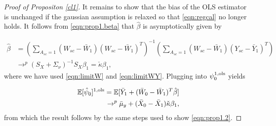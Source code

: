 \begin{proof}[Proof of Propositon \ref{cl1}]
It remains to show that the bias of the OLS estimator is unchanged if the gaussian assumption is relaxed so that \eqref{eqn:regcal} no longer holds. It follows from \eqref{eqn:prop1.beta} that $\hat{\beta}$ is asymptotically given by

    \begin{align*}
    \hat{\beta} &= \left(\sum_{A_{sc}=1} (W_{sc} - \bar{W}_1)(W_{sc} - \bar{W}_1)^T \right)^{-1} \left(\sum_{A_{sc}=1} (W_{sc} - \bar{W}_1)(Y_{sc} - \bar{Y}_1)^T\right) \\
     & \rightarrow^p  (S_X + \Sigma_\nu)^{-1}S_X \beta_1 = \check{\kappa} \beta_1, 
    \end{align*}
where we have used \eqref{eqn:limitW} and \eqref{eqn:limitWY}. Plugging into $\psi_0^{1,\textup{ols}}$ yields

\begin{align*}    
    \mathbb{E}[\hat{\psi}_0]^{1,\textup{ols}} = \mathbb{E}[ \bar{Y}_1 + (\bar{W}_0 - \bar{W}_1)^T \hat{\beta}] \\
    \rightarrow^p  \bar{\mu}_y + (\bar{X}_0 - \bar{X}_1)\check{\kappa} \beta_1,
\end{align*}
from which the result follows by the same steps used to show \eqref{eqn:prop1.2}.


    

\end{proof}
